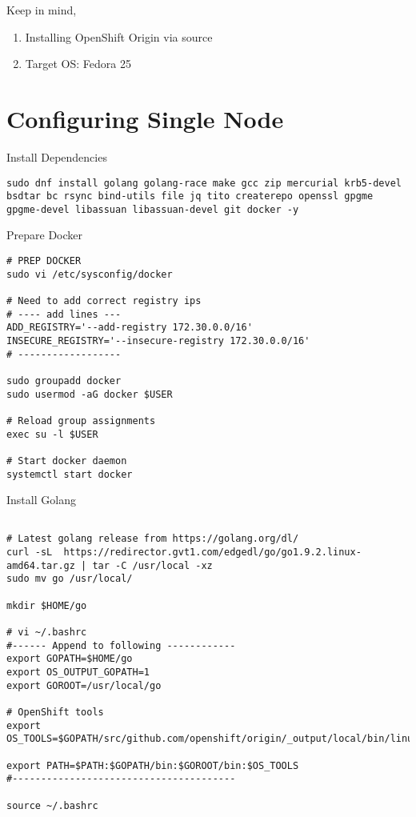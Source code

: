 \documentclass{article}
\begin{document}
Keep in mind,
\begin{enumerate}[(1)]
  \item Installing OpenShift Origin via source
  \item Target OS: Fedora 25
\end{enumerate}

\section{Configuring Single Node}

Install Dependencies
\begin{lstlisting}[style=shell]
sudo dnf install golang golang-race make gcc zip mercurial krb5-devel bsdtar bc rsync bind-utils file jq tito createrepo openssl gpgme gpgme-devel libassuan libassuan-devel git docker -y
\end{lstlisting}

Prepare Docker
\begin{lstlisting}[style=shell]
# PREP DOCKER
sudo vi /etc/sysconfig/docker

# Need to add correct registry ips
# ---- add lines ---
ADD_REGISTRY='--add-registry 172.30.0.0/16'
INSECURE_REGISTRY='--insecure-registry 172.30.0.0/16'
# ------------------

sudo groupadd docker
sudo usermod -aG docker $USER

# Reload group assignments
exec su -l $USER

# Start docker daemon
systemctl start docker
\end{lstlisting}

Install Golang
\begin{lstlisting}[style=shell]

# Latest golang release from https://golang.org/dl/
curl -sL  https://redirector.gvt1.com/edgedl/go/go1.9.2.linux-amd64.tar.gz | tar -C /usr/local -xz
sudo mv go /usr/local/

mkdir $HOME/go

# vi ~/.bashrc
#------ Append to following ------------
export GOPATH=$HOME/go
export OS_OUTPUT_GOPATH=1
export GOROOT=/usr/local/go

# OpenShift tools
export OS_TOOLS=$GOPATH/src/github.com/openshift/origin/_output/local/bin/linux/amd64/

export PATH=$PATH:$GOPATH/bin:$GOROOT/bin:$OS_TOOLS
#---------------------------------------

source ~/.bashrc
\end{lstlisting}
\end{document}

